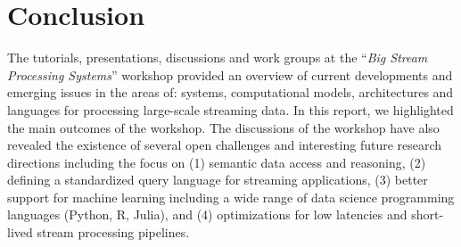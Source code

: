 \section{Conclusion}\label{sec:conclusion}
The tutorials, presentations, discussions and work groups at the ``\emph{Big Stream
  Processing Systems}'' workshop provided an overview of current developments and emerging issues in the areas of: systems,
computational models, architectures and languages for processing large-scale streaming data. 
In this report, we highlighted the main outcomes of the workshop. The discussions of the workshop have also revealed the existence of several open challenges and interesting future research directions including the focus on (1) semantic data access and reasoning, (2) defining a standardized query language for streaming applications, (3) better support for machine learning including a wide range of data science programming languages (Python, R, Julia), and (4) optimizations for low latencies and short-lived stream processing pipelines.
